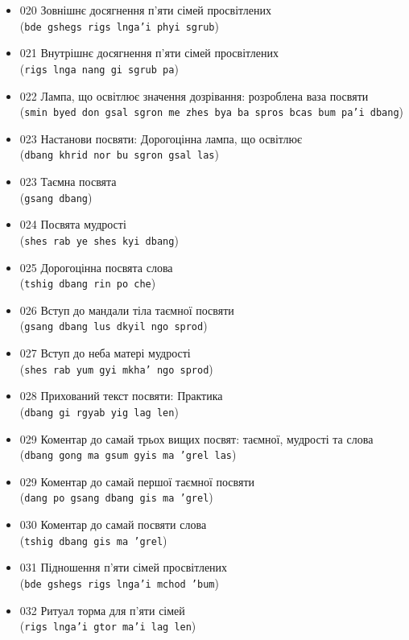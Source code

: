 \documentclass{article}
\begin{document}
\begingroup\raggedright
\begin{itemize}
\item 020 Зовнішнє досягнення п'яти сімей просвітлених \\ (\texttt{bde gshegs rigs lnga'i phyi sgrub})
\item 021 Внутрішнє досягнення п'яти сімей просвітлених \\ (\texttt{rigs lnga nang gi sgrub pa})
\item 022 Лампа, що освітлює значення дозрівання: розроблена ваза посвяти \\ (\texttt{smin byed don gsal sgron me zhes bya ba spros bcas bum pa'i dbang})
\item 023 Настанови посвяти: Дорогоцінна лампа, що освітлює \\ (\texttt{dbang khrid nor bu sgron gsal las})
\item 023 Таємна посвята \\ (\texttt{gsang dbang})
\item 024 Посвята мудрості \\ (\texttt{shes rab ye shes kyi dbang})
\item 025 Дорогоцінна посвята слова \\ (\texttt{tshig dbang rin po che})
\item 026 Вступ до мандали тіла таємної посвяти \\ (\texttt{gsang dbang lus dkyil ngo sprod})
\item 027 Вступ до неба матері мудрості \\ (\texttt{shes rab yum gyi mkha' ngo sprod})
\item 028 Прихований текст посвяти: Практика \\ (\texttt{dbang gi rgyab yig lag len})
\item 029 Коментар до самай трьох вищих посвят: таємної, мудрості та слова \\ (\texttt{dbang gong ma gsum gyis ma 'grel las})
\item 029 Коментар до самай першої таємної посвяти \\ (\texttt{dang po gsang dbang gis ma 'grel})
\item 030 Коментар до самай посвяти слова \\ (\texttt{tshig dbang gis ma 'grel})
\item 031 Підношення п'яти сімей просвітлених \\ (\texttt{bde gshegs rigs lnga'i mchod 'bum})
\item 032 Ритуал торма для п’яти сімей \\ (\texttt{rigs lnga'i gtor ma'i lag len})

\end{itemize}
\end{document}
